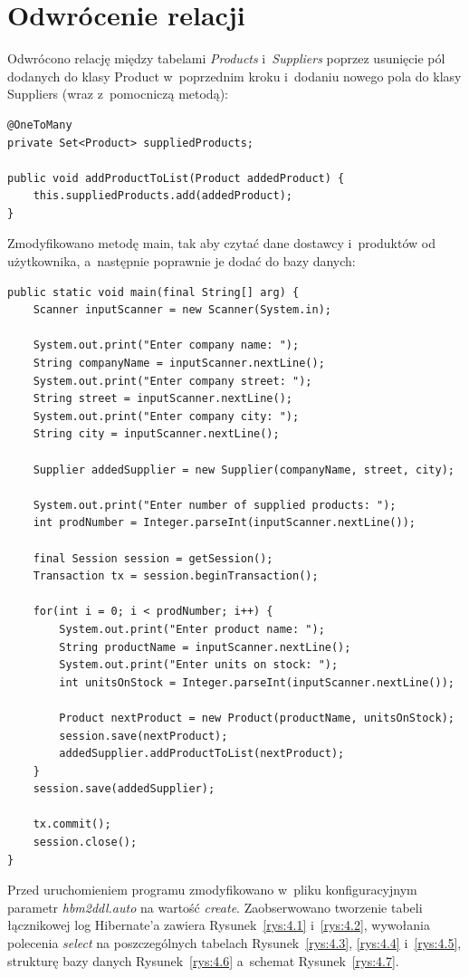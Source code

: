\documentclass[12pt, a4paper]{mwart}
\begin{document}
\clearpage

\section{Odwrócenie relacji}

Odwrócono relację między tabelami \textit{Products} i~\textit{Suppliers} poprzez usunięcie pól dodanych do klasy Product w~poprzednim kroku i~dodaniu nowego pola do klasy Suppliers (wraz z~pomocniczą metodą):

\begin{lstlisting}
@OneToMany
private Set<Product> suppliedProducts;

public void addProductToList(Product addedProduct) {
	this.suppliedProducts.add(addedProduct);
}
\end{lstlisting}

Zmodyfikowano metodę main, tak aby czytać dane dostawcy i~produktów od użytkownika, a~następnie poprawnie je dodać do bazy danych:

\begin{lstlisting}
public static void main(final String[] arg) {
	Scanner inputScanner = new Scanner(System.in);

	System.out.print("Enter company name: ");
	String companyName = inputScanner.nextLine();
	System.out.print("Enter company street: ");
	String street = inputScanner.nextLine();
	System.out.print("Enter company city: ");
	String city = inputScanner.nextLine();

	Supplier addedSupplier = new Supplier(companyName, street, city);

	System.out.print("Enter number of supplied products: ");
	int prodNumber = Integer.parseInt(inputScanner.nextLine());

	final Session session = getSession();
	Transaction tx = session.beginTransaction();

	for(int i = 0; i < prodNumber; i++) {
		System.out.print("Enter product name: ");
		String productName = inputScanner.nextLine();
		System.out.print("Enter units on stock: ");
		int unitsOnStock = Integer.parseInt(inputScanner.nextLine());

		Product nextProduct = new Product(productName, unitsOnStock);
		session.save(nextProduct);
		addedSupplier.addProductToList(nextProduct);
	}
	session.save(addedSupplier);

	tx.commit();
	session.close();
}
\end{lstlisting}

Przed uruchomieniem programu zmodyfikowano w~pliku konfiguracyjnym parametr \textit{hbm2ddl.auto} na wartość \textit{create}. Zaobserwowano tworzenie tabeli łącznikowej \ppauza log Hibernate'a zawiera Rysunek~\ref{rys:4.1} i~\ref{rys:4.2}, wywołania polecenia \textit{select} na poszczególnych tabelach Rysunek~\ref{rys:4.3}, \ref{rys:4.4} i~\ref{rys:4.5}, strukturę bazy danych Rysunek~\ref{rys:4.6} a~schemat Rysunek~\ref{rys:4.7}.
\end{document}

